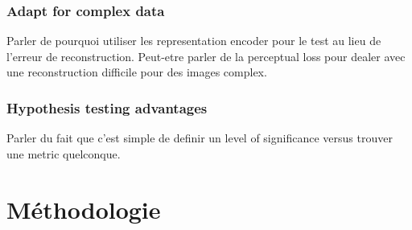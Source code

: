 \subsection{Adapt for complex data}

Parler de pourquoi utiliser les representation encoder pour le test au lieu de l'erreur de reconstruction. Peut-etre parler de la perceptual loss pour dealer avec une reconstruction difficile pour des images complex.

\subsection{Hypothesis testing advantages}

Parler du fait que c'est simple de definir un level of significance versus trouver une metric quelconque.
\chapter{Méthodologie}     %
\label{chap:methodologie}                   %


